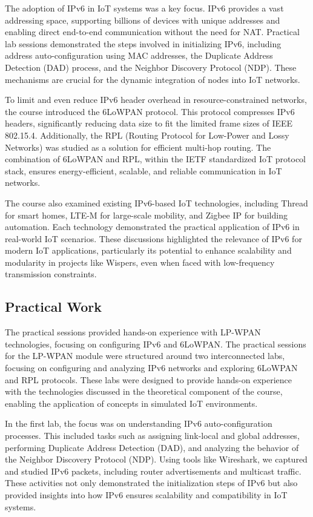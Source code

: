 The adoption of IPv6 in IoT systems was a key focus. IPv6 provides a vast addressing space, supporting billions of devices with unique addresses and enabling direct end-to-end communication without the need for NAT. Practical lab sessions demonstrated the steps involved in initializing IPv6, including address auto-configuration using MAC addresses, the Duplicate Address Detection (DAD) process, and the Neighbor Discovery Protocol (NDP). These mechanisms are crucial for the dynamic integration of nodes into IoT networks.
\vspace{0.25cm}

To limit and even reduce IPv6 header overhead in resource-constrained networks, the course introduced the 6LoWPAN protocol. This protocol compresses IPv6 headers, significantly reducing data size to fit the limited frame sizes of IEEE 802.15.4. Additionally, the RPL (Routing Protocol for Low-Power and Lossy Networks) was studied as a solution for efficient multi-hop routing. The combination of 6LoWPAN and RPL, within the IETF standardized IoT protocol stack, ensures energy-efficient, scalable, and reliable communication in IoT networks.
\vspace{0.25cm}

The course also examined existing IPv6-based IoT technologies, including Thread for smart homes, LTE-M for large-scale mobility, and Zigbee IP for building automation. Each technology demonstrated the practical application of IPv6 in real-world IoT scenarios. These discussions highlighted the relevance of IPv6 for modern IoT applications, particularly its potential to enhance scalability and modularity in projects like Wispers, even when faced with low-frequency transmission constraints.

\subsection{Practical Work}
\indent \indent The practical sessions provided hands-on experience with LP-WPAN technologies, focusing on configuring IPv6 and 6LoWPAN.
The practical sessions for the LP-WPAN module were structured around two interconnected labs, focusing on configuring and analyzing IPv6 networks and exploring 6LoWPAN and RPL protocols. These labs were designed to provide hands-on experience with the technologies discussed in the theoretical component of the course, enabling the application of concepts in simulated IoT environments.

\vspace{0.25cm}
In the first lab, the focus was on understanding IPv6 auto-configuration processes. This included tasks such as assigning link-local and global addresses, performing Duplicate Address Detection (DAD), and analyzing the behavior of the Neighbor Discovery Protocol (NDP). Using tools like Wireshark, we captured and studied IPv6 packets, including router advertisements and multicast traffic. These activities not only demonstrated the initialization steps of IPv6 but also provided insights into how IPv6 ensures scalability and compatibility in IoT systems.

